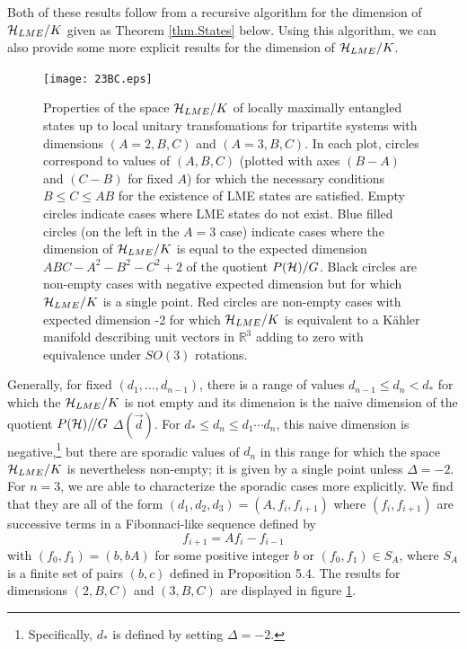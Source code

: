 \documentclass[12pt]{article}
\theoremstyle{definition}
\newcommand{\be}{\begin{equation}}
\newcommand{\ee}{\end{equation}}
\newcommand{\GITquot}{/\!/}
\begin{document}
Both of these results follow from a recursive algorithm for the dimension of ${\cal H}_{LME}/K$ given as Theorem \ref{thm.States} below. Using this algorithm, we can also provide some more explicit results
for the dimension of ${\cal H}_{LME}/K$.


\begin{figure}
\centering
\texttt{[image: 23BC.eps]}
\caption{Properties of the space ${\cal H}_{LME}/K$ of locally maximally entangled states up to local unitary transfomations for tripartite systems with dimensions $(A=2,B,C)$ and $(A=3,B,C)$. In each plot, circles correspond to values of $(A,B,C)$ (plotted with axes $(B-A)$ and $(C-B)$ for fixed $A$) for which the necessary conditions $B \le C \le AB$ for the existence of LME states are satisfied. Empty circles indicate cases where LME states do not exist. Blue filled circles (on the left in the $A=3$ case) indicate cases where the dimension of ${\cal H}_{LME}/K$ is equal to the expected dimension $ABC - A^2 - B^2 - C^2 + 2$ of the quotient $P({\cal H})/G$. Black circles are non-empty cases with negative expected dimension but for which ${\cal H}_{LME}/K$ is a single point. Red circles are non-empty cases with expected dimension -2 for which ${\cal H}_{LME}/K$ is equivalent to a K\"ahler manifold describing unit vectors in $\mathbb{R}^3$ adding to zero with equivalence under $SO(3)$ rotations.}
\label{fig:23BC}
\end{figure}

Generally, for fixed
$(d_1,\dots, d_{n-1})$, there is a range of values $d_{n-1} \le d_n <
d_*$ for which the ${\cal H}_{LME}/K$ is not empty and its dimension
is the naive dimension of the quotient $P({\cal H})\GITquot G$ $\Delta(\vec{d})$. For $d_* \le d_n \le d_1 \cdots d_n$,
this naive dimension is negative,\footnote{Specifically, $d_*$ is
defined by setting $\Delta = -2$.} but there are sporadic values of
$d_n$ in this range for which the space ${\cal H}_{LME}/K$ is
nevertheless non-empty; it is given by a single point unless $\Delta =
-2$. For $n=3$, we are able to characterize the sporadic cases more explicitly. We find that they are all of the form $(d_1,d_2,d_3) = (A, f_i, f_{i+1})$ where $(f_i,f_{i+1})$ are successive terms in a Fibonnaci-like sequence defined by
\be
\label{Fib0}
f_{i+1} = A f_i - f_{i-1}
\ee
with $(f_0,f_1) = (b,bA)$ for some positive integer $b$ or $(f_0,f_1) \in S_A$, where $S_A$ is a finite set of pairs $(b,c)$ defined in Proposition 5.4. The results for dimensions $(2,B,C)$ and $(3,B,C)$ are displayed in figure \ref{fig:23BC}.
\end{document}
